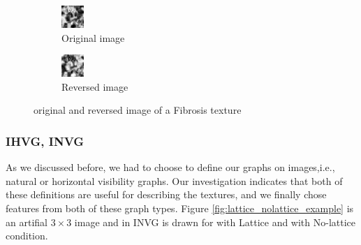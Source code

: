 \documentclass[conference]{IEEEtran}
\begin{document}
\begin{figure}[h]
    \centering
    \begin{subfigure}{0.24\textwidth}
        \centering
        \includegraphics[width=0.55\linewidth]{origianl_fibrosis.png}
        \caption{Original image}
        \label{fig:original_texture}
    \end{subfigure}
    \hfill
    \begin{subfigure}{0.24\textwidth}
        \centering
        \includegraphics[width=0.55\linewidth]{reversed_fibrosis.png}
        \caption{Reversed image}
        \label{fig:reversed_texture}
    \end{subfigure}
    \caption{original and reversed image of a Fibrosis texture}
    \label{fig:original_reversed_texture}
\end{figure}



\subsubsection{\textbf{IHVG, INVG}}
As we discussed before, we had to choose to define our graphs on images,i.e., natural or horizontal visibility graphs. Our investigation indicates that both of these definitions are useful for describing the textures, and we finally chose features from both of these graph types.
Figure \ref{fig:lattice_nolattice_example} is an artifial $3\times3$ image and in \cite{b1} INVG is drawn for with Lattice and with No-lattice condition.
\end{document}
